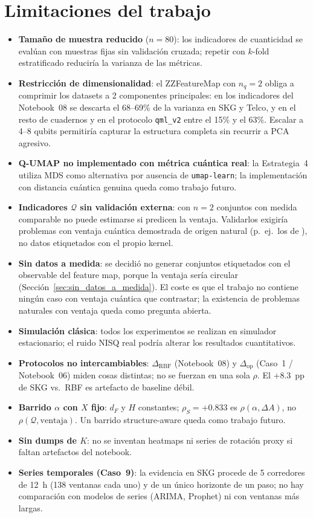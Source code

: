 \section{Limitaciones del trabajo}

\begin{itemize}
    \item \textbf{Tamaño de muestra reducido} ($n=80$): los indicadores de cuanticidad se evalúan con muestras fijas sin validación cruzada; repetir con $k$-fold estratificado reduciría la varianza de las métricas.
    \item \textbf{Restricción de dimensionalidad}: el ZZFeatureMap con $n_q = 2$ obliga a comprimir los datasets a 2 componentes principales: en los indicadores del Notebook~08 se descarta el 68--69\% de la varianza en SKG y Telco, y en el resto de cuadernos y en el protocolo \texttt{qml\_v2} entre el 15\% y el 63\%. Escalar a 4--8 qubits permitiría capturar la estructura completa sin recurrir a PCA agresivo.
    \item \textbf{Q-UMAP no implementado con métrica cuántica real}: la Estrategia~4 utiliza MDS como alternativa por ausencia de \texttt{umap-learn}; la implementación con distancia cuántica genuina queda como trabajo futuro.
    \item \textbf{Indicadores $\mathcal{Q}$ sin validación externa}: con $n=2$ conjuntos con medida comparable no puede estimarse si predicen la ventaja. Validarlos exigiría problemas con ventaja cuántica demostrada de origen natural (p.~ej.\ los de \citealp{liu2021}), no datos etiquetados con el propio kernel.
    \item \textbf{Sin datos a medida}: se decidió no generar conjuntos etiquetados con el observable del feature map, porque la ventaja sería circular (Sección~\ref{sec:sin_datos_a_medida}). El coste es que el trabajo no contiene ningún caso con ventaja cuántica que contrastar; la existencia de problemas naturales con ventaja queda como pregunta abierta.
    \item \textbf{Simulación clásica}: todos los experimentos se realizan en simulador estacionario; el ruido NISQ real podría alterar los resultados cuantitativos.
    \item \textbf{Protocolos no intercambiables}: $\Delta_{\mathrm{RBF}}$ (Notebook~08) y $\Delta_{\mathrm{op}}$ (Caso~1 / Notebook~06) miden cosas distintas; no se fuerzan en una sola $\rho$. El $+8.3$~pp de SKG vs.\ RBF es artefacto de baseline débil.
    \item \textbf{Barrido $\alpha$ con $X$ fijo}: $d_F$ y $H$ constantes; $\rho_S=+0.833$ es $\rho(\alpha,\Delta A)$, no $\rho(\mathcal{Q},\mathrm{ventaja})$. Un barrido structure-aware queda como trabajo futuro.
    \item \textbf{Sin dumps de $K$}: no se inventan heatmaps ni series de rotación proxy si faltan artefactos del notebook.
    \item \textbf{Series temporales (Caso~9)}: la evidencia en SKG procede de 5 corredores de 12~h (138 ventanas cada uno) y de un único horizonte de un paso; no hay comparación con modelos de series (ARIMA, Prophet) ni con ventanas más largas.
\end{itemize}

